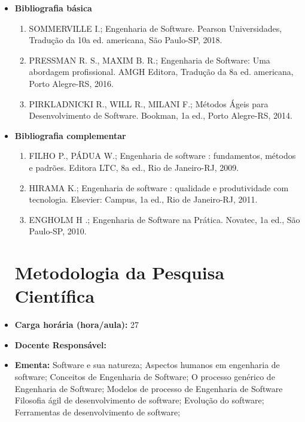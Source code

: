 \documentclass[11pt,fleqn]{book} %
\begin{document}
\begin{itemize}
	\item \textbf{Bibliografia básica}
	\begin{enumerate}
		\item SOMMERVILLE I.; Engenharia de Software. Pearson Universidades, Tradução da 10a ed. americana, São Paulo-SP, 2018.
		\item PRESSMAN R. S., MAXIM B. R.; Engenharia de Software: Uma abordagem profissional. AMGH Editora, Tradução da 8a ed. americana, Porto Alegre-RS, 2016.
		\item PIRKLADNICKI R., WILL R., MILANI F.; Métodos Ágeis para Desenvolvimento de Software. Bookman, 1a ed., Porto Alegre-RS, 2014.
	\end{enumerate}
	\item \textbf{Bibliografia complementar}
	\begin{enumerate}
		\item FILHO P., PÁDUA W.; Engenharia de software : fundamentos, métodos e padrões. Editora LTC, 8a ed., Rio de Janeiro-RJ, 2009.
		\item HIRAMA K.; Engenharia de software : qualidade e produtividade com tecnologia. Elsevier: Campus, 1a ed., Rio de Janeiro-RJ, 2011.
		\item ENGHOLM H .; Engenharia de Software na Prática. Novatec, 1a ed., São Paulo-SP, 2010.
	
	\end{enumerate} 
	
\newpage
\section{Metodologia da Pesquisa Científica}\label{disc:engenharia_de_requisitos}
	
	\item \textbf{Carga horária (hora/aula):} 27
	\item \textbf{Docente Responsável:}~
	\item \textbf{Ementa:} 
    Software e sua natureza;
    Aspectos humanos em engenharia de software;
	Conceitos de Engenharia de Software;
	O processo genérico de Engenharia de Software;
	Modelos de processo de Engenharia de Software
	Filosofia ágil de desenvolvimento de software;
    Evolução do software;
    Ferramentas de desenvolvimento de software;
	

\end{itemize}
\end{document}
